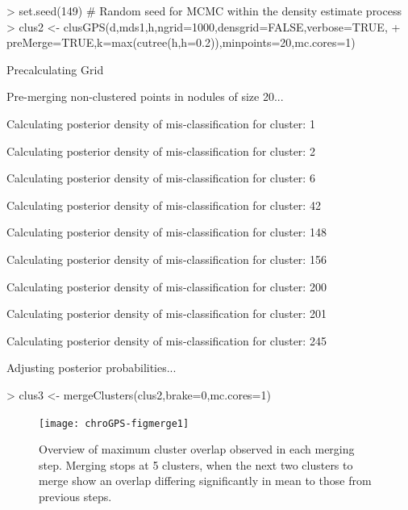\documentclass[a4paper,12pt,nogin]{article}
\begin{document}
\begin{Schunk}
\begin{Sinput}
> set.seed(149) # Random seed for MCMC within the density estimate process
> clus2 <- clusGPS(d,mds1,h,ngrid=1000,densgrid=FALSE,verbose=TRUE,
+ preMerge=TRUE,k=max(cutree(h,h=0.2)),minpoints=20,mc.cores=1)
\end{Sinput}
\begin{Soutput}
Precalculating Grid

Pre-merging non-clustered points in nodules of size 20...

Calculating posterior density of mis-classification for cluster: 1


Calculating posterior density of mis-classification for cluster: 2


Calculating posterior density of mis-classification for cluster: 6


Calculating posterior density of mis-classification for cluster: 42


Calculating posterior density of mis-classification for cluster: 148


Calculating posterior density of mis-classification for cluster: 156


Calculating posterior density of mis-classification for cluster: 200


Calculating posterior density of mis-classification for cluster: 201


Calculating posterior density of mis-classification for cluster: 245


Adjusting posterior probabilities...
\end{Soutput}
\end{Schunk}
\begin{Schunk}
\begin{Sinput}
> clus3 <- mergeClusters(clus2,brake=0,mc.cores=1)
\end{Sinput}
\end{Schunk}

\normalsize

\begin{figure}
\begin{center}
\texttt{[image: chroGPS-figmerge1]}
\end{center}
\caption{Overview of maximum cluster overlap observed in each merging step. Merging stops at 5 clusters, when the next two clusters to merge show an overlap differing significantly in mean to those from previous steps.}
\label{fig:merge1}
\end{figure}
\end{document}
